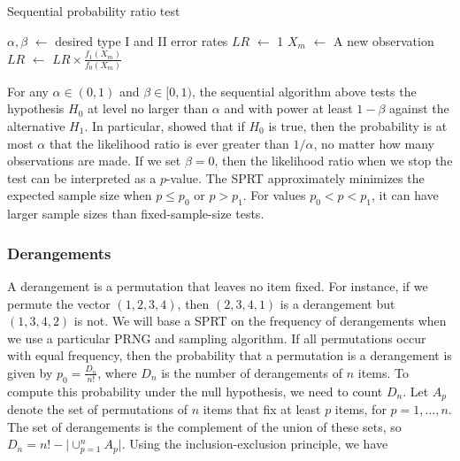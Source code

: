 \documentclass[12pt]{article}
\newcommand*\Let[2]{\State #1 $\gets$ #2}
\begin{document}
\begin{algorithm}[H]                      %
\caption{Sequential probability ratio test}          %
\label{algo:sprt}                           %
\begin{algorithmic}[1]             %
\Let{$\alpha, \beta$}{desired type I and II error rates}
\Let{$LR$}{1}
     \Let{$X_m$}{A new observation}
     \Let{$LR$}{$LR \times \frac{f_1(X_m)}{f_0(X_m)}$}
\EndWhile
{}
\EndIf
{}
\EndIf
\end{algorithmic}  
\end{algorithm}

For any $\alpha \in (0, 1)$ and $\beta \in [0, 1)$, the sequential algorithm above tests the hypothesis $H_0$ at level no larger than $\alpha$ and with power at least $1-\beta$ against the alternative $H_1$.
In particular, \citet{wald_sequential_1947} showed that if $H_0$ is true, then the probability is at most $\alpha$ that the likelihood ratio is ever greater than $1/\alpha$, no matter how many observations are made. If we set $\beta = 0$, then the likelihood ratio when we stop the test can be interpreted as a $p$-value.
The SPRT approximately minimizes the expected sample size when $p \le p_0$ or $p > p_1$. For values $p_0 < p < p_1$, it can have larger sample sizes than fixed-sample-size tests.

\subsubsection{Derangements}
A derangement is a permutation that leaves no item fixed. 
For instance, if we permute the vector $(1, 2, 3, 4)$, then $(2, 3, 4, 1)$ is a derangement but $(1, 3, 4, 2)$ is not. 
We will base a SPRT on the frequency of derangements when we use a particular PRNG and sampling algorithm. 
If all permutations occur with equal frequency, then the probability that a permutation is a derangement is given by $p_0 = \frac{D_n}{n!}$, where $D_n$ is the number of derangements of $n$ items. 
To compute this probability under the null hypothesis, we need to count $D_n$.
Let $A_p$ denote the set of permutations of $n$ items that fix at least $p$ items, for $p=1,\dots,n$. 
The set of derangements is the complement of the union of these sets, so $D_n = n! - \lvert \cup_{p=1}^n A_p \rvert$. 
Using the inclusion-exclusion principle, we have
\end{document}
